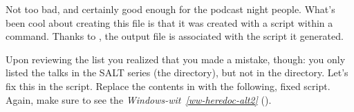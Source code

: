 \sphinxAtStartPar
Not too bad, and certainly good enough for the podcast night people.
What’s been cool about creating this file is that it was created with
a script within a  command. Thanks to ,
the output file  is associated with the script it
generated.

\sphinxAtStartPar
Upon reviewing the list you realized that you made a mistake, though: you only
listed the talks in the SALT series (the
 directory), but not
in the  directory.
Let’s fix this in the script. Replace the contents in 
with the following, fixed script. Again, make sure to see the
\textit{Windows-wit}~{\windowswiticoninline}\textit{\ref{ww-heredoc-alt2}} {\hyperref[\detokenize{basics/101-109-rerun:ww-heredoc-alt2}]{}} ().
